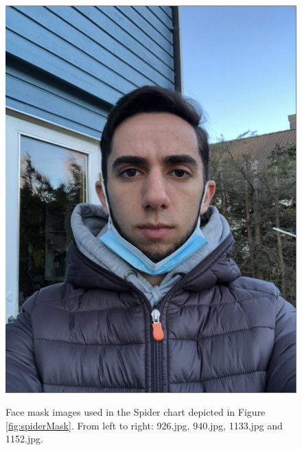 \begin{figure}[h]
        {\includegraphics[scale = 0.13]{figures/1152.png}\hspace{0.4cm}}
    \caption{Face mask images used in the Spider chart depicted in Figure \ref{fig:spiderMask}. From left to right: 926.jpg, 940.jpg, 1133.jpg and 1152.jpg.}
    \label{fig:masks2}
\end{figure}

